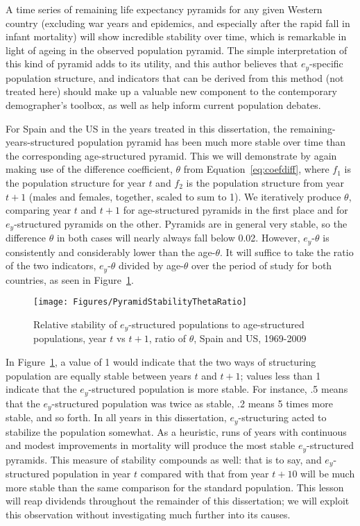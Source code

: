 A time series of remaining life expectancy pyramids for any given Western 
country (excluding war years and epidemics, and especially after the rapid fall
in infant mortality) will show incredible stability over time, which is
remarkable in light of ageing in the observed population pyramid. The simple 
interpretation of this kind of pyramid adds to its utility, and this author 
believes that $e_y$-specific population structure, and
indicators that can be derived from this method (not treated here) should 
make up a valuable new component to the contemporary demographer's toolbox, as well 
as help inform current population debates. 

For Spain and the US in the years treated in this dissertation,
the remaining-years-structured population pyramid has been much more
stable over time than the corresponding age-structured pyramid. This we will
demonstrate by again making use of the difference coefficient, $\theta$ from Equation~\ref{eq:coefdiff}, where $f_1$ is the
population structure for year $t$ and $f_2$ is the population structure from
year $t+1$ (males and females, together, scaled to sum to 1). We iteratively
produce $\theta$, comparing year $t$ and $t+1$ for age-structured pyramids in
the first place and for $e_y$-structured pyramids on the other. Pyramids are in
general very stable, so the difference $\theta$ in both cases will nearly always
fall below 0.02. However, $e_y$-$\theta$ is consistently and considerably lower
than the age-$\theta$. It will suffice to take the ratio of the two indicators,
 $e_y$-$\theta$ divided by age-$\theta$ over the period of study for both
 countries, as seen in Figure~\ref{fig:PyramidStability}.

\begin{figure}
      \centering
      \caption{Relative stability of $e_y$-structured populations to
                age-structured populations, year $t$ vs $t+1$, ratio of
                $\theta$, Spain and US, 1969-2009} 
         \texttt{[image: Figures/PyramidStabilityThetaRatio]}
      \label{fig:PyramidStability} 
\end{figure}

In Figure~\ref{fig:PyramidStability}, a value of 1 would indicate that the two
ways of structuring population are equally stable between years $t$ and $t+1$;
values less than 1 indicate that the $e_y$-structured population is more stable.
For instance, .5 means that the $e_y$-structured population was twice as stable,
.2 means 5 times more stable, and so forth. In all years in this dissertation,
$e_y$-structuring acted to stabilize the population somewhat. As a heuristic,
runs of years with continuous and modest improvements in mortality will produce
the most stable $e_y$-structured pyramids. This measure of stability compounds
as well: that is to say, and $e_y$-structured population in year $t$
compared with that from year $t+10$ will be much more stable than the same
comparison for the standard population. This lesson will reap dividends
throughout the remainder of this dissertation; we will exploit this observation
without investigating much further into its causes.

